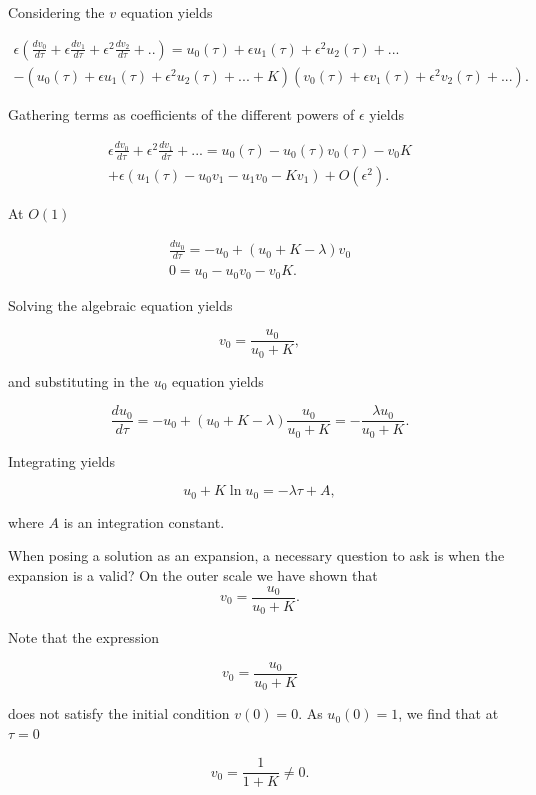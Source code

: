 \documentclass[
  letterpaper,
  DIV=11,
  numbers=noendperiod]{scrreprt}
\begin{document}
Considering the \(v\) equation yields

\[
\begin{aligned}
\epsilon(\frac{dv_0}{d\tau} + \epsilon \frac{dv_1}{d\tau} + \epsilon^2\frac{dv_2}{d\tau} + ..) = u_0(\tau) + \epsilon u_1(\tau) + \epsilon^2 u_2(\tau) + ...  \nonumber \\ -(u_0(\tau) + \epsilon u_1(\tau) + \epsilon^2 u_2(\tau) + ...+ K) (v_0(\tau) + \epsilon v_1(\tau) + \epsilon^2 v_2(\tau) + ...).  \nonumber 
\end{aligned}
\]

Gathering terms as coefficients of the different powers of \(\epsilon\)
yields

\[
\begin{aligned}
\epsilon\frac{dv_0}{d\tau} + \epsilon^2 \frac{dv_1}{d\tau} + ... = u_0(\tau)-   u_0(\tau)v_0(\tau) -v_0 K  \nonumber \\ +\epsilon (u_1(\tau) - u_0v_1 - u_1v_0 - Kv_1) + O(\epsilon^2).  \nonumber 
\end{aligned}
\]

At \(O(1)\)

\[
\begin{aligned}
\frac{du_0}{d\tau} = -u_0+ (u_0+ K-\lambda)v_0  \nonumber \\ 
 0= u_0 - u_0 v_0 -v_0K.    \nonumber
\end{aligned}
\]

Solving the algebraic equation yields

\[
v_0=\frac{u_0}{u_0+K},
\]

and substituting in the \(u_0\) equation yields

\[
\frac{du_0}{d\tau} = -u_0+ (u_0+ K-\lambda)\frac{u_0}{u_0+K} = -\frac{\lambda u_0}{u_0+K}.
\]

Integrating yields

\[
u_0+K\ln u_0=-\lambda \tau +A,
\]

where \(A\) is an integration constant.

When posing a solution as an expansion, a necessary question to ask is
when the expansion is a valid? On the outer scale we have shown that \[
v_0=\frac{u_0}{u_0+K}.
\]

Note that the expression

\[
v_0=\frac{u_0}{u_0+K}
\]

does not satisfy the initial condition \(v(0)=0\). As \(u_0(0)=1\), we
find that at \(\tau=0\)

\[
v_0=\frac{1}{1+K} \neq 0.
\]
\end{document}

